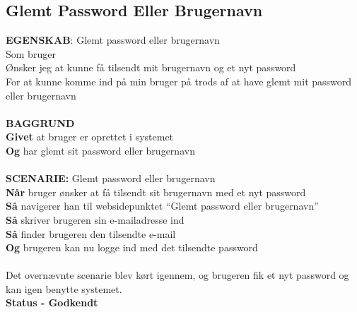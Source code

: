 \subsection{Glemt Password Eller Brugernavn}
{\color{blue}\textbf{EGENSKAB}:} Glemt password eller brugernavn \\
Som bruger \\
Ønsker jeg at kunne få tilsendt mit brugernavn og et nyt password \\
For at kunne komme ind på min bruger på trods af at have glemt mit password eller brugernavn\\ \\
{\color{blue}\textbf{BAGGRUND}} \\
{\color{blue}\textbf{Givet}} at bruger er oprettet i systemet \\ {\color{blue}\textbf{Og}} har glemt sit password eller brugernavn \\
\\
{\color{blue}\textbf{SCENARIE:}} Glemt password eller brugernavn \\
{\color{blue}\textbf{Når}} bruger ønsker at få tilsendt sit brugernavn med et nyt password \\
{\color{blue}\textbf{Så}} navigerer han til websidepunktet  “Glemt password eller brugernavn” \\
{\color{blue}\textbf{Så}} skriver brugeren sin e-mailadresse ind\\
{\color{blue}\textbf{Så}} finder brugeren den tilsendte e-mail \\
{\color{blue}\textbf{Og}} brugeren kan nu logge ind med det tilsendte password
\\ \\
Det overnævnte scenarie blev kørt igennem, og brugeren fik et nyt password og kan igen benytte systemet. \\
\textbf{Status - Godkendt}

